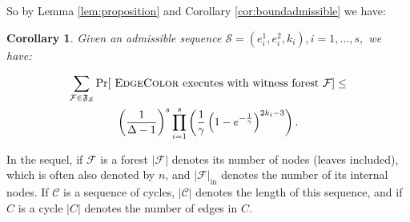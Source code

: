 \documentclass{amsart}
\theoremstyle{plain}
\newtheorem{corollary}{Corollary}
\newcommand{\EC}{\textsc{EdgeColor}}
\newcommand{\C}{\mathcal{C}}
\newcommand{\F}{\mathcal{F}}
\begin{document}
So by Lemma \ref{lem:proposition} and  Corollary \ref{cor:boundadmissible} we have:

\begin{corollary}\label{cor:boundadmissible2}
Given an admissible  sequence ${\mathcal S}= (e^1_i, e^2_i, k_i), i=1, \ldots, s,$ we have:

\begin{multline}\label{eq:disjoint2}
\sum_{{\mathcal F} \in {\frak F}_{\mathcal S}} \Pr[ \text{ \EC\ executes with  witness forest } {\mathcal F}] \leq \\
\left(\frac{1}{\Delta-1}\right)^s  \prod_{i=1}^s \left(\frac{1}{\gamma}\left(1 -  e^{-\frac{1}{\gamma}} \right)^{2k_i-3}\right).\end{multline}\end{corollary}






In the sequel,  if $\F$ is a forest $|\F|$ denotes its number of nodes (leaves included), which is often also  denoted by $n$, and $|\F|_{\mathrm{in}}$ denotes the number of its internal nodes. 
If $\C$ is a sequence of cycles, $|\C|$ denotes  the length of this sequence,  and if $C$ is a cycle $|C|$ denotes the number of edges in $C$.
\end{document}

